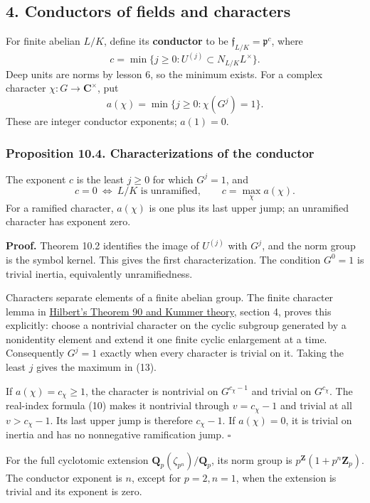 \documentclass[11pt,a4paper]{article}
\begin{document}
\subsection{4. Conductors of fields and
characters}\label{conductors-of-fields-and-characters}

For finite abelian \(L/K\), define its \textbf{conductor} to be
\(\mathfrak f_{L/K}=\mathfrak p^c\), where \[
c=\min\{j\geq0:U^{(j)}\subset N_{L/K}L^\times\}.
\tag{11}
\] Deep units are norms by lesson 6, so the minimum exists. For a
complex character \(\chi:G\to\mathbf C^\times\), put \[
a(\chi)=\min\{j\geq0:\chi(G^j)=1\}.
\tag{12}
\] These are integer conductor exponents; \(a(1)=0\).

\subsubsection{Proposition 10.4. Characterizations of the
conductor}\label{proposition-10.4.-characterizations-of-the-conductor}

The exponent \(c\) is the least \(j\geq0\) for which \(G^j=1\), and \[
c=0\ \Longleftrightarrow\ L/K\text{ is unramified},\qquad
c=\max_\chi a(\chi).
\tag{13}
\] For a ramified character, \(a(\chi)\) is one plus its last upper
jump; an unramified character has exponent zero.

\textbf{Proof.} Theorem 10.2 identifies the image of \(U^{(j)}\) with
\(G^j\), and the norm group is the symbol kernel. This gives the first
characterization. The condition \(G^0=1\) is trivial inertia,
equivalently unramifiedness.

Characters separate elements of a finite abelian group. The finite
character lemma in
\href{../hilberts-theorem-90-and-kummer-theory.html}{Hilbert's Theorem
90 and Kummer theory}, section 4, proves this explicitly: choose a
nontrivial character on the cyclic subgroup generated by a nonidentity
element and extend it one finite cyclic enlargement at a time.
Consequently \(G^j=1\) exactly when every character is trivial on it.
Taking the least \(j\) gives the maximum in (13).

If \(a(\chi)=c_\chi\geq1\), the character is nontrivial on
\(G^{c_\chi-1}\) and trivial on \(G^{c_\chi}\). The real-index formula
(10) makes it nontrivial through \(v=c_\chi-1\) and trivial at all
\(v>c_\chi-1\). Its last upper jump is therefore \(c_\chi-1\). If
\(a(\chi)=0\), it is trivial on inertia and has no nonnegative
ramification jump. \(\square\)

For the full cyclotomic extension
\(\mathbf Q_p(\zeta_{p^n})/\mathbf Q_p\), its norm group is
\(p^{\mathbf Z}(1+p^n\mathbf Z_p)\). The conductor exponent is \(n\),
except for \(p=2,n=1\), when the extension is trivial and its exponent
is zero.
\end{document}
